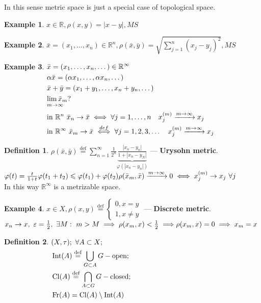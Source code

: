 \documentclass[12pt, fleqn]{article}
\makeatletter
\theoremstyle{definition}
\newtheorem*{defn}{Definition}
\newtheorem{ex}{Example}
\newcommand\alim[2]{
    \begin{array}[t]{@{}l@{}}
     \lim #1 \\[-1ex] \scriptstyle #2 
    \end{array}
}
\theoremstyle{break}
\theoremstyle{theorem}
\renewcommand\leq{\leqslant}
\renewcommand\phi{\varphi}
\renewcommand\epsilon{\varepsilon}
\newcommand{\defeq}{\overset{\text{def}}{=}}
\newcommand{\R}{\mathbb{R}}
\DeclareMathOperator{\clOp}{Cl}
\newcommand{\cl}[1]{\clOp({#1})}
\DeclareMathOperator{\intOp}{Int}
\newcommand{\inter}[1]{\intOp({#1})}
\DeclareMathOperator{\frOp}{Fr}
\newcommand{\fr}[1]{\frOp({#1})}
\makeatother
\begin{document}
\noindent
In this sense metric space is just a special case of topological space.
\begin{ex}
  $x \in \R, \rho(x, y) = |x - y|, MS$
\end{ex}
\begin{ex}
  $\bar{x} = (x_1, \dotsc, x_n) \in \R^n, \rho(\bar{x}, \bar{y}) = \sqrt{\sum\limits_{j = 1}^n(x_j - y_j)^2}, MS$
\end{ex}
\begin{ex}
  $\begin{aligned}[t]
    & \bar{x} = (x_1, \dotsc, x_n, \dotso) \in \R^\infty \\ 
    & \alpha\bar{x} = (\alpha x_1, \dotsc, \alpha x_n, \dotso) \\ 
    & \bar{x} + \bar{y} = (x_1 + y_1, \dotsc, x_n + y_n, \dotso)\\
    & \alim{\bar{x}_m}{m \to \infty}?\\
    & \textnormal{in}\ \R^n\ \bar{x}_n \to \bar{x} \iff \forall j = 1,
    \dotsc, n\quad x_j^{(m)} \xrightarrow{m \to \infty} x_j \\ 
    & \textnormal{in}\ \R^{\infty}\ \bar{x}_m \to \bar{x} \overset{def}{\iff} \forall j = 1,2,3,\dotso \quad x_j^{(m)} \xrightarrow{m \to \infty} x_j
  \end{aligned}$
\end{ex}
\begin{defn}
  $\rho(\bar{x}, \bar{y}) \defeq \sum\limits_{n = 1}^\infty \frac{1}{2^n}\underbrace{\frac{|x_n - y_n|}{1 + |x_n - y_N|}}_{\phi(|x_n - y_n|)}$ 
  --- \textbf{Urysohn metric}. \\
  $\phi(t) = \frac{t}{1 + t} \\ 
  \phi(t_1 + t_2) \leq \phi(t_1) + \phi(t_2) \\ 
  \rho(\bar{x}_m, \bar{x}) \xrightarrow{m \to \infty} 0 \iff x_j^{(m)} \to x_j\ \forall j$\\
  In this way $\R^\infty$ is a metrizable space.
\end{defn}
\begin{ex}
$x \in X, \rho(x, y) \defeq
\begin{cases}
  0, x = y
  \\1, x \neq y
\end{cases}$ --- \textbf{Discrete metric}. \\ 
$x_n \to x,\ \epsilon = \frac{1}{2},\ \exists M:\ m > M \implies \rho(x_m, x) < \frac{1}{2} \implies\\
\rho(x_m, x) = 0 \implies x_m = x$
\end{ex}
\begin{defn}
  $\begin{aligned}[t]
    & (X, \tau);\ \forall A \subset X; \\
    & \inter{A} \defeq \bigcup\limits_{G \subset A} G - \textnormal{open}; \\
    & \cl{A} \defeq \bigcap\limits_{A \subset G} G - \textnormal{closed}; \\
    & \fr{A} = \cl{A} \setminus \inter{A}
  \end{aligned}$
\end{defn}
\end{document}
